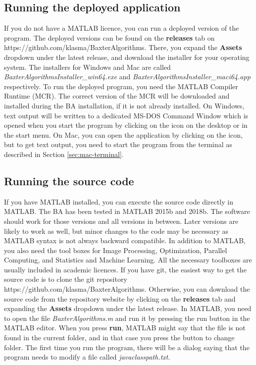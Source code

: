 \documentclass[a4paper, oneside, onecolumn, 11pt]{article}
\newcommand{\file}[1]{\emph{#1}}
\newcommand{\command}[1]{\textbf{#1}}
\newcommand{\control}[1]{\textbf{#1}}
\begin{document}
\subsection{Running the deployed application}
\label{sec:run-deployed}
If you do not have a MATLAB licence, you can run a deployed version of the program. The deployed versions can be found on the \control{releases} tab on https://github.com/klasma/BaxterAlgorithms. There, you expand the \control{Assets} dropdown under the latest release, and download the installer for your operating system. The installers for Windows and Mac are called \file{BaxterAlgorithmsInstaller\_win64.exe} and \file{BaxterAlgorithmsInstaller\_maci64.app} respectively. To run the deployed program, you need the MATLAB Compiler Runtime (MCR). The correct version of the MCR will be downloaded and installed during the BA installation, if it is not already installed. On Windows, text output will be written to a dedicated MS-DOS Command Window which is opened when you start the program by clicking on the icon on the desktop or in the start menu. On Mac, you can open the application by clicking on the icon, but to get text output, you need to start the program from the terminal as described in Section \ref{sec:mac-terminal}.

\subsection{Running the source code}
\label{sec:source}
If you have MATLAB installed, you can execute the source code directly in MATLAB. The BA has been tested in MATLAB 2015b and 2018b. The software should work for those versions and all versions in between. Later versions are likely to work as well, but minor changes to the code may be necessary as MATLAB syntax is not always backward compatible. In addition to MATLAB, you also need the tool boxes for Image Processing, Optimization, Parallel Computing, and Statistics and Machine Learning. All the necessary toolboxes are usually included in academic licences. If you have git, the easiest way to get the source code is to clone the git repository https://github.com/klasma/BaxterAlgorithms. Otherwise, you can download the source code from the repository website by clicking on the \control{releases} tab and expanding the \control{Assets} dropdown under the latest release. In MATLAB, you need to open the file \file{BaxterAlgorithms.m} and run it by pressing the run button in the MATLAB editor. When you press \command{run}, MATLAB might say that the file is not found in the current folder, and in that case you press the button to change folder. The first time you run the program, there will be a dialog saying that the program needs to modify a file called \file{javaclasspath.txt}.
\end{document}
